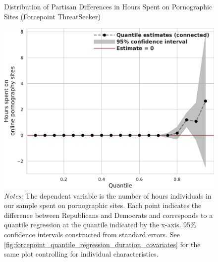 \documentclass[12pt, letterpaper]{article}
\begin{document}
\begin{figure}[t]
	\centering
	\caption{Distribution of Partisan Differences in Hours Spent on Pornographic Sites (Forcepoint ThreatSeeker)}
	\includegraphics[width=.7\linewidth]{figs/forcepoint_quantile_reg_duration_adult.pdf}
	\caption*{\footnotesize \emph{Notes:} 
		The dependent variable is the number of hours individuals in our sample spent on pornographic sites.
		Each point indicates the difference between Republicans and Democrats and corresponds to a quantile regression at the quantile indicated by the x-axis.
		95\% confidence intervals constructed from standard errors.
		See \cref{fig:forcepoint_quantile_regression_duration_covariates} for the same plot controlling for individual characteristics.
	}
	\label{fig:forcepoint_quantile_regression_duration}
\end{figure}
\end{document}
